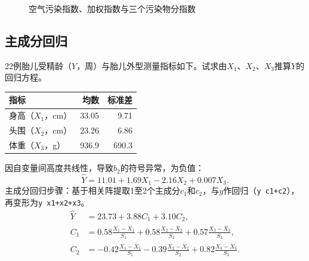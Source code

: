 \begin{figure}[!htbp]
\caption{空气污染指数、加权指数与三个污染物分指数}
\end{figure}\FloatBarrier

\subsection{主成分回归}
22例胎儿受精龄（$Y$，周）与胎儿外型测量指标如下。试求由$X_1$、$X_2$、$X_3$推算$Y$的回归方程。
\begin{center}\begin{tabular}{lrr}\toprule
{\bfseries 指标}&{\bfseries 均数}&{\bfseries 标准差}\\\midrule
身高（$X_1$，cm）&33.05&9.71\\
头围（$X_2$，cm）&23.26&6.86\\
体重（$X_3$，g）&936.9&690.3\\\bottomrule
\end{tabular}\end{center}
因自变量间高度共线性，导致$b_2$的符号异常，为负值：
\[
\widehat Y=11.01+1.69X_1-2.16X_2+0.007X_3.
\]
主成分回归步骤：基于相关阵提取1至2个主成分$c_1$和$c_2$，与$y$作回归（\texttt{y\string~c1+c2}），再变形为\texttt{y\string~x1+x2+x3}。
\begin{align*}
\widehat Y&=23.73+3.88C_1+3.10C_2,\\
C_1&=0.58\frac{X_1-\bar X_1}{S_1}+0.58\frac{X_2-\bar X_2}{S_2}+0.57\frac{X_3-\bar X_3}{S_3},\\
C_2&=-0.42\frac{X_1-\bar X_1}{S_1}-0.39\frac{X_2-\bar X_2}{S_2}+0.82\frac{X_3-\bar X_3}{S_3}.
\end{align*}
